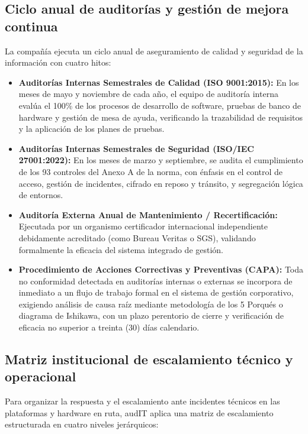 \subsection{Ciclo anual de auditorías y gestión de mejora continua}\label{sec:1-auditorias}

La compañía ejecuta un ciclo anual de aseguramiento de calidad y seguridad de la información con cuatro hitos:

\begin{itemize}
  \item \textbf{Auditorías Internas Semestrales de Calidad (ISO 9001:2015):} En los meses de mayo y noviembre de cada año, el equipo de auditoría interna evalúa el 100\% de los procesos de desarrollo de software, pruebas de banco de hardware y gestión de mesa de ayuda, verificando la trazabilidad de requisitos y la aplicación de los planes de pruebas.
  \item \textbf{Auditorías Internas Semestrales de Seguridad (ISO/IEC 27001:2022):} En los meses de marzo y septiembre, se audita el cumplimiento de los 93 controles del Anexo A de la norma, con énfasis en el control de acceso, gestión de incidentes, cifrado en reposo y tránsito, y segregación lógica de entornos.
  \item \textbf{Auditoría Externa Anual de Mantenimiento / Recertificación:} Ejecutada por un organismo certificador internacional independiente debidamente acreditado (como Bureau Veritas o SGS), validando formalmente la eficacia del sistema integrado de gestión.
  \item \textbf{Procedimiento de Acciones Correctivas y Preventivas (CAPA):} Toda no conformidad detectada en auditorías internas o externas se incorpora de inmediato a un flujo de trabajo formal en el sistema de gestión corporativo, exigiendo análisis de causa raíz mediante metodología de los 5 Porqués o diagrama de Ishikawa, con un plazo perentorio de cierre y verificación de eficacia no superior a treinta (30) días calendario.
\end{itemize}

\subsection{Matriz institucional de escalamiento técnico y operacional}\label{sec:1-escalamiento}

Para organizar la respuesta y el escalamiento ante incidentes técnicos en las plataformas y hardware en ruta, audIT aplica una matriz de escalamiento estructurada en cuatro niveles jerárquicos:

